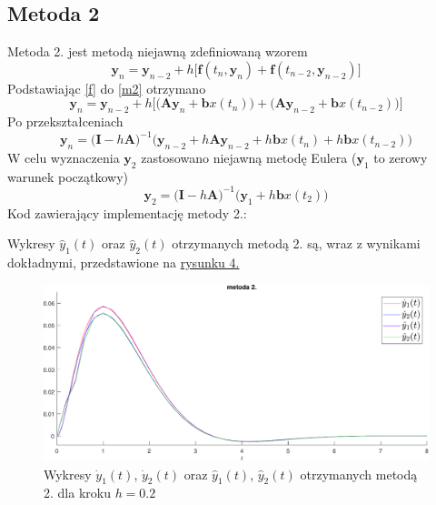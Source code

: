 \documentclass[a4paper, 12pt, twoside, openany]{article}
\newcommand{\y}{\mathbf{y}}
\newcommand{\I}{\mathbf{I}}
\newcommand{\A}{\mathbf{A}}
\renewcommand{\b}{\mathbf{b}}
\begin{document}
    \subsection{Metoda 2}
    Metoda 2. jest metodą niejawną zdefiniowaną wzorem
    \begin{equation}
        \label{m2}
        \y_n = \y_{n-2} + h\Big[\mathbf{f}\left(t_{n},\y_{n}\right) +       \mathbf{f}\left(t_{n-2},\y_{n-2}\right)\Big]
    \end{equation}
    Podstawiając \eqref{f} do \eqref{m2} otrzymano
    $$ \y_n = \y_{n-2} + h\Big[\big(\A\y_n + \b x(t_n) \big) + \big(\A\y_{n-2} + \b x(t_{n-2})\big)\Big] $$
    Po przekształceniach
    $$ \y_n = \Big( \I - h \A \Big)^{-1} \Big( \y_{n-2} + h\A\y_{n-2} + h\b x(t_n) + h\b x(t_{n-2}) \Big) $$
    W celu wyznaczenia $\y_2$ zastosowano niejawną metodę Eulera ($\y_1$ to zerowy warunek początkowy)
    $$ \y_2 = \Big(\I - h\A\Big)^{-1} \Big(\y_1 + h\b x(t_2)\Big) $$
    Kod zawierający implementację metody 2.:
    
    \noindent
    Wykresy $\hat{y}_1(t)$ oraz $\hat{y}_2(t)$ otrzymanych metodą 2. są, wraz z wynikami dokładnymi, przedstawione na \hyperref[fig:rys4]{rysunku 4.}
    \begin{figure}[H]
        \centering
        \includegraphics[width=\linewidth]{wykres3t.pdf}
        \caption{Wykresy $\dot{y}_1(t)$, $\dot{y}_2(t)$ oraz $\hat{y}_1(t)$, $\hat{y}_2(t)$ otrzymanych metodą 2. dla kroku $h = 0.2$ }
        \label{fig:rys4} %
    \end{figure}
\end{document}
